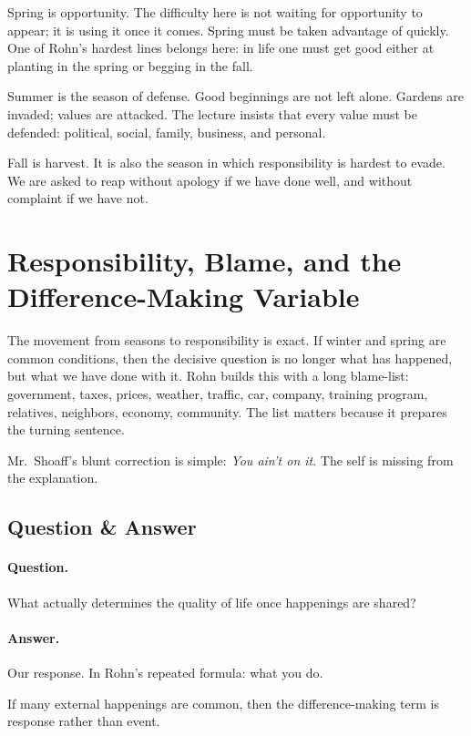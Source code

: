 Spring is opportunity. The difficulty here is not waiting for opportunity to appear; it is using it once it comes. Spring must be taken advantage of quickly. One of Rohn's hardest lines belongs here: in life one must get good either at planting in the spring or begging in the fall.

Summer is the season of defense. Good beginnings are not left alone. Gardens are invaded; values are attacked. The lecture insists that every value must be defended: political, social, family, business, and personal.

Fall is harvest. It is also the season in which responsibility is hardest to evade. We are asked to reap without apology if we have done well, and without complaint if we have not.

\section{Responsibility, Blame, and the Difference-Making Variable}

The movement from seasons to responsibility is exact. If winter and spring are common conditions, then the decisive question is no longer what has happened, but what we have done with it. Rohn builds this with a long blame-list: government, taxes, prices, weather, traffic, car, company, training program, relatives, neighbors, economy, community. The list matters because it prepares the turning sentence.

Mr.\ Shoaff's blunt correction is simple: \emph{You ain't on it}. The self is missing from the explanation.

\subsection{Question \& Answer}

\paragraph{Question.} What actually determines the quality of life once happenings are shared?

\paragraph{Answer.} Our response. In Rohn's repeated formula: what you do.

\begin{proposition}
If many external happenings are common, then the difference-making term is response rather than event.
\end{proposition}

